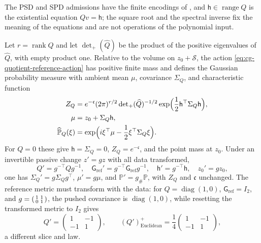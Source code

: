 The PSD and SPD admissions have the finite encodings of
, and \(\mathsf h\in\operatorname{range}Q\)
is the existential equation \(Qv=\mathsf h\); the square root and the spectral
inverse fix the meaning of the equations and are not operations of the
polynomial input.

Let \(r=\operatorname{rank}Q\) and let \(\det_+(\widehat Q)\) be the product of the
positive eigenvalues of \(\widehat Q\), with empty product one. Relative to the
volume on \(z_0+\mathcal S\), the action \eqref{eq:cg-quotient-reference-action}
has positive finite mass and defines the Gaussian probability measure with
ambient mean \(\mu\), covariance \(\Sigma_Q\), and characteristic function
\begin{equation}
\begin{aligned}
Z_Q&=e^{-\mathfrak c}(2\pi)^{r/2}
       \det\nolimits_+(\widehat Q)^{-1/2}
       \exp\Bigl(\frac12\mathsf h^\top\Sigma_Q\mathsf h\Bigr),\\
\mu&=z_0+\Sigma_Q\mathsf h,\\
\widehat{\mathbb P}_Q(\xi)
 &=\exp\Bigl(i\xi^\top\mu-\frac12\xi^\top\Sigma_Q\xi\Bigr).
\end{aligned}
\label{eq:cg-quotient-gaussian-law}
\end{equation}
For \(Q=0\) these give \(\mathsf h=\Sigma_Q=0\), \(Z_Q=e^{-\mathfrak c}\), and the point
mass at \(z_0\). Under an invertible passive change \(z'=gz\) with all data
transformed,
\begin{equation}
Q'=g^{-\top}Qg^{-1},\quad
\mathsf G_{\mathrm{ref}}'=g^{-\top}\mathsf G_{\mathrm{ref}}g^{-1},\quad
\mathsf h'=g^{-\top}\mathsf h,\quad z_0'=gz_0,
\label{eq:cg-quotient-gauge-data}
\end{equation}
one has \(\Sigma_Q'=g\Sigma_Qg^\top\), \(\mu'=g\mu\), and
\(\mathbb P'=g_\#\mathbb P\), with \(Z_Q\) and \(\mathfrak c\) unchanged. The
reference metric must transform with the data: for \(Q=\operatorname{diag}(1,0)\),
\(\mathsf G_{\mathrm{ref}}=I_2\), and
\(g=\begin{psmallmatrix}1&1\\0&1\end{psmallmatrix}\), the pushed covariance is
\(\operatorname{diag}(1,0)\), while resetting the transformed metric to \(I_2\)
gives
\begin{equation}
Q'=\begin{pmatrix}1&-1\\-1&1\end{pmatrix},
\qquad
(Q')^+_{\mathrm{Euclidean}}
=\frac14\begin{pmatrix}1&-1\\-1&1\end{pmatrix},
\label{eq:cg-quotient-reference-counterexample}
\end{equation}
a different slice and law. 

